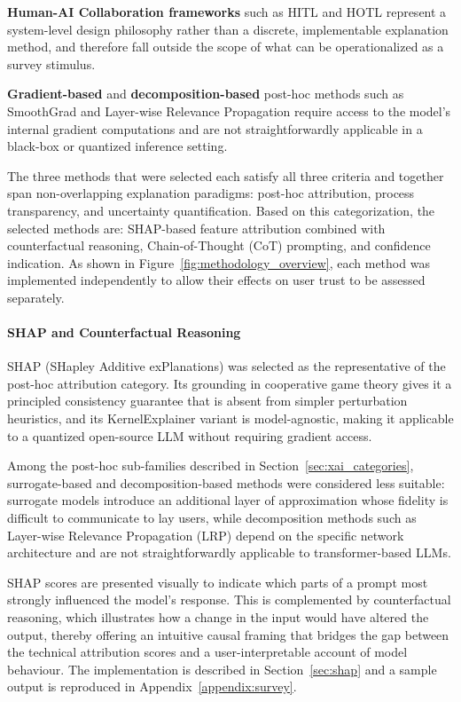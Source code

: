 \textbf{Human-AI Collaboration frameworks} such as HITL and HOTL represent a system-level design philosophy rather than a discrete, implementable explanation method, and therefore fall outside the scope of what can be operationalized as a survey stimulus.

\textbf{Gradient-based} and \textbf{decomposition-based} post-hoc methods such as SmoothGrad \cite{smilkov_smoothgrad_2017} and Layer-wise Relevance Propagation \cite{binder_layer-wise_2016} require access to the model's internal gradient computations and are not straightforwardly applicable in a black-box or quantized inference setting.

The three methods that were selected each satisfy all three criteria and together span non-overlapping explanation paradigms: post-hoc attribution, process transparency, and uncertainty quantification. Based on this categorization, the selected methods are: SHAP-based feature attribution combined with counterfactual reasoning, Chain-of-Thought (CoT) prompting, and confidence indication. As shown in Figure~\ref{fig:methodology_overview}, each method was implemented independently to allow their effects on user trust to be assessed separately.

\paragraph{SHAP and Counterfactual Reasoning}
SHAP (SHapley Additive exPlanations) \cite{lundberg_unified_2017} was selected as the representative of the post-hoc attribution category. Its grounding in cooperative game theory gives it a principled consistency guarantee that is absent from simpler perturbation heuristics, and its KernelExplainer variant is model-agnostic, making it applicable to a quantized open-source LLM without requiring gradient access. 

Among the post-hoc sub-families described in Section~\ref{sec:xai_categories}, surrogate-based and decomposition-based methods were considered less suitable: surrogate models introduce an additional layer of approximation whose fidelity is difficult to communicate to lay users, while decomposition methods such as Layer-wise Relevance Propagation (LRP) depend on the specific network architecture and are not straightforwardly applicable to transformer-based LLMs. 

SHAP scores are presented visually to indicate which parts of a prompt most strongly influenced the model's response. This is complemented by counterfactual reasoning, which illustrates how a change in the input would have altered the output, thereby offering an intuitive causal framing that bridges the gap between the technical attribution scores and a user-interpretable account of model behaviour. The implementation is described in Section~\ref{sec:shap} and a sample output is reproduced in Appendix~\ref{appendix:survey}.

